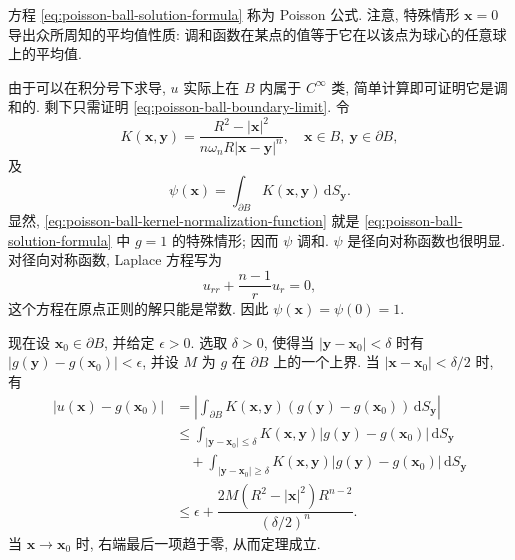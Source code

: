 方程 \eqref{eq:poisson-ball-solution-formula} 称为 Poisson 公式. 注意, 特殊情形 $\bm{x}=0$ 导出众所周知的平均值性质: 调和函数在某点的值等于它在以该点为球心的任意球上的平均值.

\begin{Proof}
由于可以在积分号下求导, $u$ 实际上在 $B$ 内属于 $C^\infty$ 类, 简单计算即可证明它是调和的. 剩下只需证明 \eqref{eq:poisson-ball-boundary-limit}. 令
\begin{equation}\label{eq:poisson-ball-kernel}
K(\bm{x},\bm{y})=\dfrac{R^2-|\bm{x}|^2}{n\omega_nR|\bm{x}-\bm{y}|^n},\quad\bm{x}\in B,\ \bm{y}\in\partial B,
\end{equation}
及
\begin{equation}\label{eq:poisson-ball-kernel-normalization-function}
\psi(\bm{x})=\int_{\partial B}K(\bm{x},\bm{y})\,\mathrm{d}S_{\bm{y}}.
\end{equation}
显然, \eqref{eq:poisson-ball-kernel-normalization-function} 就是 \eqref{eq:poisson-ball-solution-formula} 中 $g=1$ 的特殊情形; 因而 $\psi$ 调和. $\psi$ 是径向对称函数也很明显. 对径向对称函数, Laplace 方程写为
\begin{equation}\label{eq:radial-laplace-equation}
u_{rr}+\dfrac{n-1}{r}u_r=0,
\end{equation}
这个方程在原点正则的解只能是常数. 因此 $\psi(\bm{x})=\psi(0)=1$.

现在设 $\bm{x}_0\in\partial B$, 并给定 $\epsilon>0$. 选取 $\delta>0$, 使得当 $|\bm{y}-\bm{x}_0|<\delta$ 时有 $|g(\bm{y})-g(\bm{x}_0)|<\epsilon$, 并设 $M$ 为 $g$ 在 $\partial B$ 上的一个上界. 当 $|\bm{x}-\bm{x}_0|<\delta/2$ 时, 有
\begin{equation}\label{eq:poisson-ball-boundary-estimate}
\begin{aligned}
|u(\bm{x})-g(\bm{x}_0)|
&=\left|\int_{\partial B}K(\bm{x},\bm{y})(g(\bm{y})-g(\bm{x}_0))\,\mathrm{d}S_{\bm{y}}\right|\\
&\leq\int_{|\bm{y}-\bm{x}_0|\leq\delta}K(\bm{x},\bm{y})|g(\bm{y})-g(\bm{x}_0)|\,\mathrm{d}S_{\bm{y}}\\
&\quad+\int_{|\bm{y}-\bm{x}_0|\geq\delta}K(\bm{x},\bm{y})|g(\bm{y})-g(\bm{x}_0)|\,\mathrm{d}S_{\bm{y}}\\
&\leq\epsilon+\dfrac{2M(R^2-|\bm{x}|^2)R^{n-2}}{(\delta/2)^n}.
\end{aligned}
\end{equation}
当 $\bm{x}\to\bm{x}_0$ 时, 右端最后一项趋于零, 从而定理成立.
\end{Proof}
